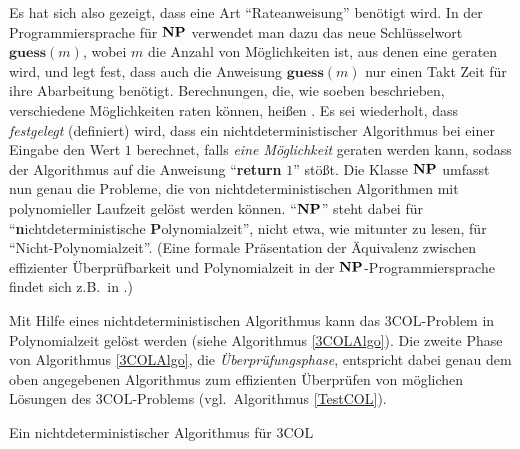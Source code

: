 Es hat sich also gezeigt, dass eine Art "`Rateanweisung"' benötigt
wird. In der Programmiersprache für $\mathbf{N}\mathbf{P}$ verwendet man dazu das neue
Schlüsselwort $\mathbf{guess}(m)$, wobei $m$ die Anzahl von
Möglichkeiten ist, aus denen eine geraten wird, und legt fest, dass
auch die Anweisung $\mathbf{guess}(m)$ nur einen Takt Zeit für ihre
Abarbeitung benötigt.  Berechnungen, die, wie soeben beschrieben,
verschiedene Möglichkeiten raten können, heißen
. Es sei wiederholt, dass \emph{festgelegt}
(definiert) wird, dass ein nichtdeterministischer Algorithmus bei
einer Eingabe den Wert $1$ berechnet, falls \emph{eine
Möglichkeit} geraten werden kann, sodass der Algorithmus auf die
Anweisung "`\textbf{return} $1$"' stößt. Die Klasse $\mathbf{N}\mathbf{P}$
umfasst nun genau die Probleme, die von nichtdeterministischen
Algorithmen mit polynomieller Laufzeit gelöst werden können.
"`$\mathbf{N}\mathbf{P}$"' steht dabei für
"`\textbf{n}ichtdeterministi\-sche \textbf{P}olynomialzeit"', nicht
etwa, wie mitunter zu lesen, für "`Nicht-Polynomialzeit"'.  (Eine
formale Präsentation der Äquivalenz zwischen effizienter
Überprüfbarkeit und Polynomialzeit in der $\mathbf{N}\mathbf{P}$-Pro\-gram\-miersprache
findet sich z.B.~in \cite[Kapitel 2.3]{GaJo79}.)

Mit Hilfe eines nichtdeterministischen Algorithmus kann das
$3\mathrm{COL}$-Problem in Polynomialzeit gelöst werden (siehe
Algorithmus \ref{3COLAlgo}). Die zweite Phase von
Algorithmus \ref{3COLAlgo}, die
\emph{Überprüfungsphase}, 
entspricht dabei genau dem oben angegebenen Algorithmus zum
effizienten Überprüfen von möglichen Lösungen des
$3\mathrm{COL}$-Problems (vgl.~Algorithmus \ref{TestCOL}).

\begin{algorithm}[H]
\caption{Ein nichtdeterministischer Algorithmus für $3\mathrm{COL}$}
\label{3COLAlgo}
\BlankLine
{}
\end{algorithm}

